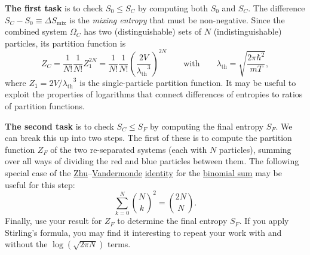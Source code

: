 \documentclass[12 pt]{article} %
\newcommand{\De}{\ensuremath{\Delta} }
\newcommand{\la}{\ensuremath{\lambda} }
\newcommand{\lath}{\ensuremath{\la_{\mathrm{th}}} }
\newcommand{\Om}{\ensuremath{\Omega} }
\begin{document}
\textbf{The first task} is to check $S_0 \leq S_C$ by computing both $S_0$ and $S_C$.
The difference $S_C - S_0 \equiv \De S_{\text{mix}}$ is the \textit{mixing entropy} that must be non-negative.
Since the combined system $\Om_C$ has two (distinguishable) sets of $N$ (indistinguishable) particles, its partition function is
\begin{equation*}
  Z_C = \frac{1}{N!} \frac{1}{N!} Z_1^{2N} = \frac{1}{N!} \frac{1}{N!} \left(\frac{2V}{\lath^3}\right)^{2N} \qquad \mbox{with} \qquad \lath = \sqrt{\frac{2\pi\hbar^2}{mT}},
\end{equation*}
where $Z_1 = 2V / \lath^3$ is the single-particle partition function.
It may be useful to exploit the properties of logarithms that connect differences of entropies to ratios of partition functions.

\newpage
\textbf{The second task} is to check $S_C \leq S_F$ by computing the final entropy $S_F$.
We can break this up into two steps.
The first of these is to compute the partition function $Z_F$ of the two re-separated systems (each with $N$ particles), summing over all ways of dividing the red and blue particles between them.
The following special case of the \href{https://en.wikipedia.org/wiki/Zhu_Shijie}{Zhu}--\href{https://en.wikipedia.org/wiki/Alexandre-Theophile_Vandermonde}{Vandermonde} \href{https://en.wikipedia.org/wiki/Vandermonde's_identity}{identity} for the \href{https://mathworld.wolfram.com/BinomialSums.html}{binomial sum} may be useful for this step:
\begin{equation*}
  \sum_{k = 0}^N \binom{N}{k}^2 = \binom{2N}{N}.
\end{equation*}
Finally, use your result for $Z_F$ to determine the final entropy $S_F$.
If you apply Stirling's formula, you may find it interesting to repeat your work with and without the $\log\left(\sqrt{2\pi N}\right)$ terms.
\end{document}
